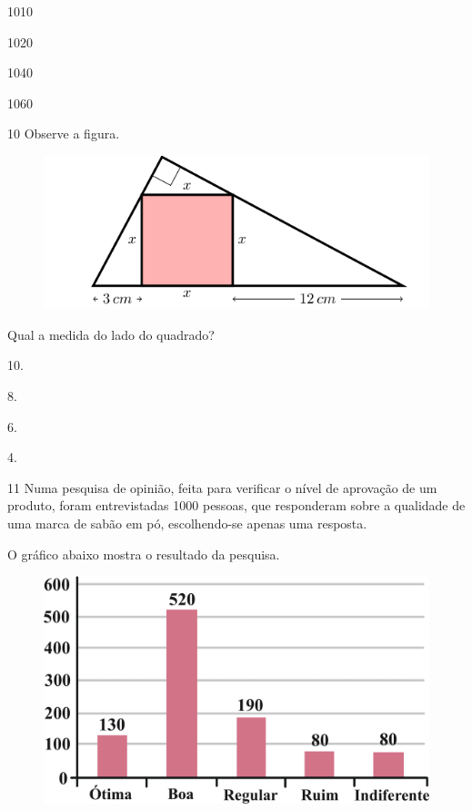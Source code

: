 \begin{escolha}
\item 1010

\item 1020

\item 1040

\item 1060
\end{escolha}


\pagebreak
\num{10} Observe a figura.

\begin{figure}[htpb!]
\centering
\includegraphics[width=.6\textwidth]{./tikz/049b.pdf}
\end{figure}

Qual a medida do lado do quadrado?

\begin{multicols}{2}
\begin{escolha}
\item 10.

\item 8.

\item 6.

\item 4.
\end{escolha}
\end{multicols}

\num{11} Numa pesquisa de opinião, feita para verificar o nível de aprovação
de um produto, foram entrevistadas 1000 pessoas, que responderam sobre a
qualidade de uma marca de sabão em pó, escolhendo-se apenas uma
resposta.

O gráfico abaixo mostra o resultado da pesquisa.

\begin{figure}[htpb!]
\centering
\includegraphics[width=.75\textwidth]{./ilustras-mat/Simulado_4-atividade_11.png}
\end{figure}

